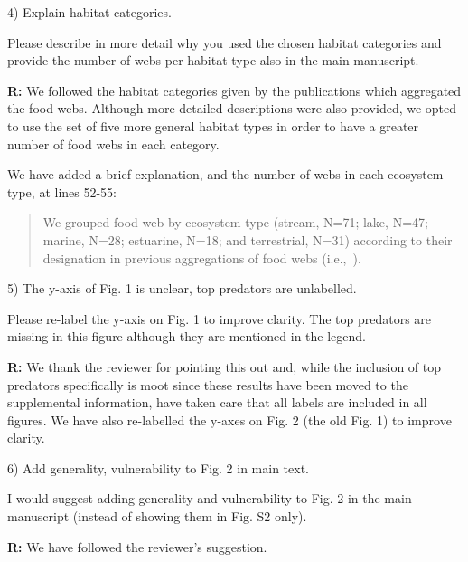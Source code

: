 \documentclass[12pt]{letter}
\newenvironment{refquote}{\bigskip \begin{it}}{\end{it}\smallskip}
\begin{document}
  4) Explain habitat categories.

  \begin{refquote}

    Please describe in more detail why you used the chosen habitat categories
    and provide the number of webs per habitat type also in the main
    manuscript.

  \end{refquote}


  \textbf{R:} We followed the habitat categories given by the publications which
  aggregated the food webs. Although more detailed descriptions were also provided, 
  we opted to use the set of five more general habitat types in order to have a 
  greater number of food webs in each category.


  We have added a brief explanation, and the number of webs in each ecosystem type, at lines 52-55:

  \begin{quotation}
    We grouped food web by ecosystem type (stream, N=71; lake, N=47; marine, N=28; estuarine, N=18;
    and terrestrial, N=31) according to their designation in previous aggregations of food webs 
    (i.e.,~\citet{GlobalWeb,Riede2011,Dunne2013}).
    
  \end{quotation}


  5) The y-axis of Fig. 1 is unclear, top predators are unlabelled.


  \begin{refquote}

    Please re-label the y-axis on Fig. 1 to improve clarity. The top predators
    are missing in this figure although they are mentioned in the legend.

  \end{refquote}


  \textbf{R:} We thank the reviewer for pointing this out 
  and, while the inclusion of top predators specifically
  is moot since these results have been moved to the 
  supplemental information, have taken care that all labels
  are included in all figures. We have also re-labelled the
  y-axes on Fig. 2 (the old Fig. 1) to improve clarity.


  6) Add generality, vulnerability to Fig. 2 in main text.


  \begin{refquote}

    I would suggest adding generality and vulnerability to Fig. 2 in the main
    manuscript (instead of showing them in Fig. S2 only).

  \end{refquote}


  \textbf{R:} We have followed the reviewer's suggestion.


  \newpage


 

\end{document}
